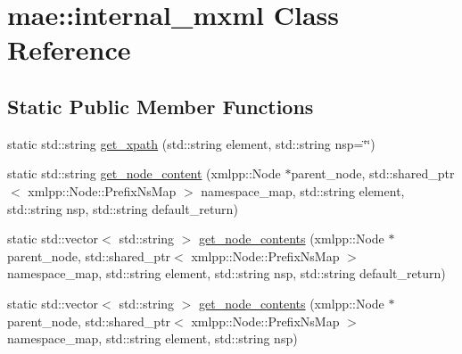 \hypertarget{classmae_1_1internal__mxml}{\section{mae\-:\-:internal\-\_\-mxml Class Reference}
\label{classmae_1_1internal__mxml}
}
\subsection*{Static Public Member Functions}
\begin{DoxyCompactItemize}
\item 
static std\-::string \hyperlink{classmae_1_1internal__mxml_a0ee360cc91fccaeb91d3ca9cc351aff5}{get\-\_\-xpath} (std\-::string element, std\-::string nsp=\char`\"{}\char`\"{})
\item 
static std\-::string \hyperlink{classmae_1_1internal__mxml_a56612af76266ba90274f987b857eb319}{get\-\_\-node\-\_\-content} (xmlpp\-::\-Node $\ast$parent\-\_\-node, std\-::shared\-\_\-ptr$<$ xmlpp\-::\-Node\-::\-Prefix\-Ns\-Map $>$ namespace\-\_\-map, std\-::string element, std\-::string nsp, std\-::string default\-\_\-return)
\item 
static std\-::vector$<$ std\-::string $>$ \hyperlink{classmae_1_1internal__mxml_a3d662e52684dcfc9c6fc51472215ee03}{get\-\_\-node\-\_\-contents} (xmlpp\-::\-Node $\ast$parent\-\_\-node, std\-::shared\-\_\-ptr$<$ xmlpp\-::\-Node\-::\-Prefix\-Ns\-Map $>$ namespace\-\_\-map, std\-::string element, std\-::string nsp, std\-::string default\-\_\-return)
\item 
static std\-::vector$<$ std\-::string $>$ \hyperlink{classmae_1_1internal__mxml_a23d40f90e3660c73c9427058729556e8}{get\-\_\-node\-\_\-contents} (xmlpp\-::\-Node $\ast$parent\-\_\-node, std\-::shared\-\_\-ptr$<$ xmlpp\-::\-Node\-::\-Prefix\-Ns\-Map $>$ namespace\-\_\-map, std\-::string element, std\-::string nsp)
\end{DoxyCompactItemize}



